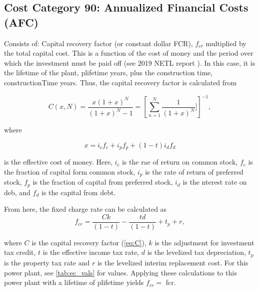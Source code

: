 
\subsection{Cost Category 90: Annualized Financial Costs (AFC)}


Consists of: Capital recovery factor (or constant dollar FCR), $f_{cr}$ multiplied by the total capital cost. This is a function of the cost of money and the period over which the investment must be paid off (see 2019 NETL report \cite{NETL2019a}). In this case, it is the lifetime of the plant, plifetime years, plus the construction time, constructionTime years. Thus, the capital recovery factor is calculated from

\begin{equation}
    C(x,N) = \frac{x(1+x)^N}{(1+x)^N-1} = \left[ \sum_{n=1}^N \frac{1}{(1+x)^N}] \right] ^{-1},
    \label{eq:C}
\end{equation}

where

\begin{equation}
    x = i_cf_c + i_pf_p +(1-t)i_df_d
\end{equation}

is the effective cost of money. Here, $i_c$ is the rae of return on common stock, $f_c$ is the fraction of capital form common stock, $i_p$ is the rate of return of preferred stock, $f_p$ is the fraction of capital from preferred stock, $i_d$ is the nterest rate on deb, and $f_d$ is the capital from debt.

From here, the fixed charge rate can be calculated as
\begin{equation}
    f_{cr} = \frac{Ck}{(1-t)} - \frac{td}{(1-t)} + t_p + r,
\end{equation}

where $C$ is the capital recovery factor (\ref{eq:C}), $k$ is the adjustment for investment tax credit, $t$ is the effective income tax rate, $d$ is the levelized tax depreciation, $t_p$ is the property tax rate and $r$ is the levelized interim replacement cost. For this power plant, see \ref{tab:ec_vals} for values. Applying these calculations to this power plant with a lifetime of plifetime yields $f_{cr} = $ fcr.\\


